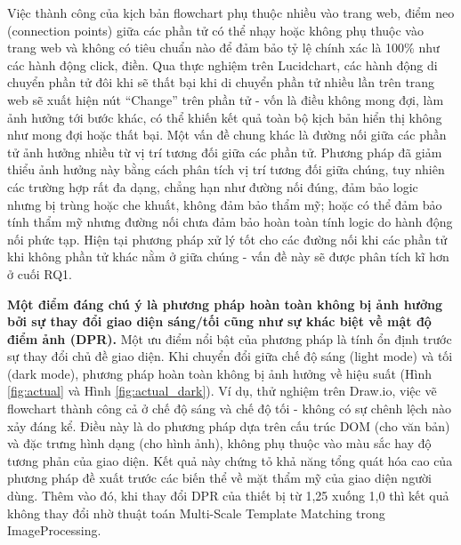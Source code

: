 \documentclass[a4paper, 12pt]{report}
\begin{document}
{Việc thành công của kịch bản flowchart phụ thuộc nhiều vào trang web, điểm neo (connection points) giữa các phần tử có thể nhạy hoặc không phụ thuộc vào trang web và không có tiêu chuẩn nào để đảm bảo tỷ lệ chính xác là 100\% như các hành động click, điền. Qua thực nghiệm trên Lucidchart, các hành động di chuyển phần tử đôi khi sẽ thất bại khi di chuyển phần tử nhiều lần trên trang web sẽ xuất hiện nút ``Change'' trên phần tử - vốn là điều không mong đợi, làm ảnh hưởng tới bước khác, có thể khiến kết quả toàn bộ kịch bản hiển thị không như mong đợi hoặc thất bại. Một vấn đề chung khác là đường nối giữa các phần tử ảnh hưởng nhiều từ vị trí tương đối giữa các phần tử. Phương pháp đã giảm thiểu ảnh hưởng này bằng cách phân tích vị trí tương đối giữa chúng, tuy nhiên các trường hợp rất đa dạng, chẳng hạn như đường nối đúng, đảm bảo logic nhưng bị trùng hoặc che khuất, không đảm bảo thẩm mỹ; hoặc có thể đảm bảo tính thẩm mỹ nhưng đường nối chưa đảm bảo hoàn toàn tính logic do hành động nối phức tạp. Hiện tại phương pháp xử lý tốt cho các đường nối khi các phần tử khi không phần tử khác nằm ở giữa chúng - vấn đề này sẽ được phân tích kĩ hơn ở cuối RQ1.





\textbf{Một điểm đáng chú ý là phương pháp hoàn toàn không bị ảnh hưởng bởi sự thay đổi giao diện sáng/tối cũng như sự khác biệt về mật độ điểm ảnh (DPR).}
Một ưu điểm nổi bật của phương pháp là tính ổn định trước sự thay đổi chủ đề giao diện. Khi chuyển đổi giữa chế độ sáng (light mode) và tối (dark mode), phương pháp hoàn toàn không bị ảnh hưởng về hiệu suất (Hình \ref{fig:actual} và Hình \ref{fig:actual_dark}). Ví dụ, thử nghiệm trên Draw.io, việc vẽ flowchart thành công cả ở chế độ sáng và chế độ tối - không có sự chênh lệch nào xảy đáng kể. Điều này là do phương pháp dựa trên cấu trúc DOM (cho văn bản) và đặc trưng hình dạng (cho hình ảnh), không phụ thuộc vào màu sắc hay độ tương phản của giao diện. Kết quả này chứng tỏ khả năng tổng quát hóa cao của phương pháp đề xuất trước các biến thể về mặt thẩm mỹ của giao diện người dùng. Thêm vào đó, khi thay đổi DPR của thiết bị từ 1,25 xuống 1,0 thì kết quả không thay đổi nhờ thuật toán Multi-Scale Template Matching trong \gls{ImageProcessing}.




}
\end{document}

